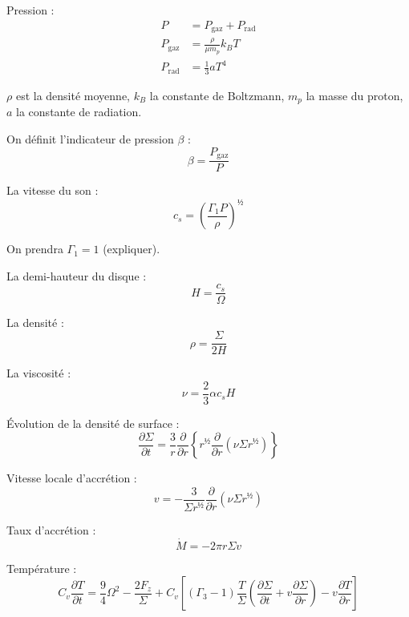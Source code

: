 Pression :
\begin{align}
    P &= P_{\mathrm{gaz}} + P_{\mathrm{rad}} \\
    P_{\mathrm{gaz}} &= \frac{\rho}{\mu m_p} k_B T \\
    P_{\mathrm{rad}} &= \frac{1}{3} a T^4
\end{align}

$\rho$ est la densité moyenne, $k_B$ la constante de Boltzmann, $m_p$ la masse du proton, $a$ la constante de radiation.

On définit l’indicateur de pression $\beta$ :
\begin{equation}
    \beta = \frac{P_{\mathrm{gaz}}}{P}
\end{equation}

La vitesse du son :
\begin{equation}
    c_s = \left( \frac{\Gamma_1 P}{\rho} \right)^½
\end{equation}

On prendra $\Gamma_1 = 1$ (expliquer).

La demi-hauteur du disque :
\begin{equation}
    H = \frac{c_s}{\Omega}
\end{equation}

La densité :
\begin{equation}
    \rho = \frac{\Sigma}{2 H}
\end{equation}

La viscosité :
\begin{equation}
    \nu = \frac{2}{3} \alpha c_s H
\end{equation}

Évolution de la densité de surface :
\begin{equation}
    \frac{\partial \Sigma}{\partial t} = \frac{3}{r} \frac{\partial}{\partial r} \left\{ r^½ \frac{\partial}{\partial r} \left(\nu \Sigma r^½ \right) \right\}
\end{equation}

Vitesse locale d’accrétion :
\begin{equation}
    v = − \frac{3}{\Sigma r^½} \frac{\partial}{\partial r} \left( \nu \Sigma r^½ \right)
\end{equation}

Taux d’accrétion :
\begin{equation}
    \dot{M} = − 2 \pi r \Sigma v
\end{equation}

Température :
\begin{equation}
    C_v \frac{\partial T}{\partial t} = \frac{9}{4} \Omega^2 − \frac{2 F_z}{\Sigma} + C_v \left[ (\Gamma_3 − 1) \frac{T}{\Sigma} \left( \frac{\partial \Sigma}{\partial t} + v \frac{\partial \Sigma}{\partial r}  \right) − v \frac{\partial T}{\partial r} \right]
\end{equation}

